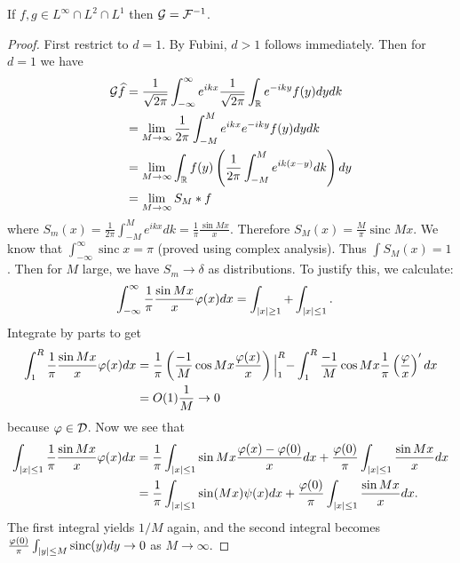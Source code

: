 \documentclass[10pt, twoside]{article}
\begin{document}
    \begin{thm}
        If $f,g \in L^{\infty} \cap L^2 \cap L^1$ then $\mathcal{G} = \mathcal{F}^{-1}$.
        \begin{proof}
            First restrict to $d=1$. By Fubini, $d > 1$ follows immediately. Then for $d=1$ we have
            \begin{align*}
                \mathcal{G}\widehat{f} &= \frac{1}{\sqrt{2\pi}} \int_{-\infty}^{\infty} e^{ikx} \frac{1}{\sqrt{2\pi}}\int_{\mathbb{R}} e^{-iky} f(y) dy dk \\
                                  &= \lim_{M \to \infty} \frac{1}{2\pi} \int_{-M}^M e^{ikx} e^{-iky} f(y) dy dk \\
                                  &= \lim_{M \to \infty} \int_{\mathbb{R}} f(y) \left( \frac{1}{2\pi} \int_{-M}^M e^{ik(x-y)} dk \right) dy \\
                                  &= \lim_{M \to \infty} S_M * f
            \end{align*}
            where $S_m(x) = \frac{1}{2\pi} \int_{-M}^{M} e^{ikx} dk = \frac{1}{\pi} \frac{\sin Mx}{x}$. Therefore $S_M(x) = \frac{M}{\pi} \operatorname{sinc} Mx$. We know that $\int_{-\infty}^{\infty} \operatorname{sinc} x = \pi$ (proved using complex analysis). Thus $\int S_M(x) = 1$. Then for $M$ large, we have $S_m \to \delta$ as distributions. To justify this, we calculate:
            \begin{align*}
                \int_{-\infty}^{\infty} \frac{1}{\pi} \frac{\sin Mx}{x} \varphi(x) dx &= \int_{\lvert x\rvert \geq 1} + \int_{\lvert x\rvert \leq 1}.
            \end{align*}
            Integrate by parts to get 
            \begin{align*}
                \int_{1}^R \frac{1}{\pi} \frac{\sin Mx}{x} \varphi(x) dx &= \frac{1}{\pi} \left( \frac{-1}{M} \cos Mx \frac{\varphi(x)}{x} \right)\Bigl\lvert_{1}^R - \int_1^R \frac{-1}{M} \cos Mx \frac{1}{\pi} \left( \frac{\varphi}{x} \right)' dx \\
                                                                         &= O(1) \frac{1}{M} \to 0
            \end{align*}
            because $\varphi \in \mathcal{D}$. Now we see that
            \begin{align*}
                \int_{\lvert x\rvert \leq 1} \frac{1}{\pi} \frac{\sin Mx}{x} \varphi(x) dx &= \frac{1}{\pi} \int_{\lvert x\rvert \leq 1} \sin Mx \frac{\varphi(x) - \varphi(0)}{x} dx + \frac{\varphi(0)}{\pi} \int_{\lvert x\rvert \leq 1} \frac{\sin Mx}{x} dx \\
                                                                                    &= \frac{1}{\pi} \int_{\lvert x\rvert \leq 1} \sin (Mx) \psi(x) dx + \frac{\varphi(0)}{\pi} \int_{\lvert x\rvert \leq 1} \frac{\sin Mx}{x} dx.
            \end{align*}
            The first integral yields $1/M$ again, and the second integral becomes $\frac{\varphi(0)}{\pi} \int_{\lvert y\rvert \leq M} \operatorname{sinc}(y) dy \to 0 $ as $M \to \infty$.
        \end{proof}
    \end{thm}
\end{document}
